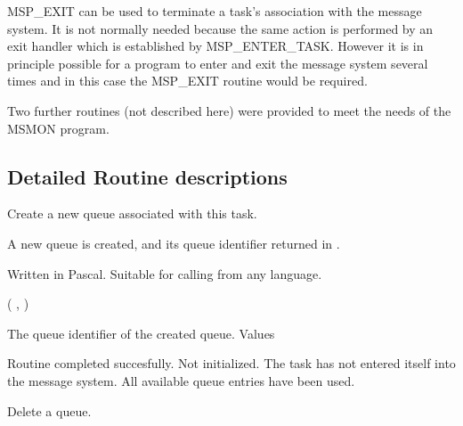 MSP\_EXIT can be used to terminate a task's association with
the message system. It is not normally needed because the same action
is performed by an exit handler which is established by MSP\_ENTER\_TASK.
However it is in principle possible for a program to enter and exit the
message system several times and in this case the MSP\_EXIT routine would
be required.

Two further routines (not described here) were provided to meet the needs of
the MSMON program.
              
\newpage
\begin{appendix}

\section{Detailed Routine descriptions}

\begin{manroutinedescription}
      Create a new queue associated with this task.

      A new queue is created, and its queue identifier returned
      in {}.

      Written in Pascal. Suitable for calling from any language.

      {} {\mantt{=}} {} ( {}, {} )

\begin{manparametertable}
                          The queue identifier of the created queue.
      {} Values
\end{manparametertable}
\begin{mantwocolumntable}
  Routine completed succesfully.
  {} Not initialized.
  The task has not entered %
itself
                         into the message system.
  All available queue entries
                         have been used.
\end{mantwocolumntable}
\end{manroutinedescription}
\begin{manroutinedescription}
      Delete a queue.


\end{manroutinedescription}
\end{appendix}
